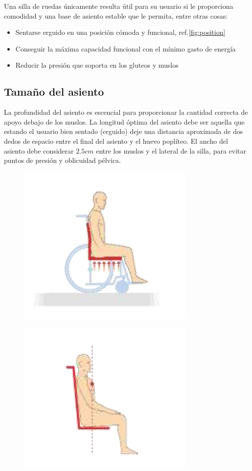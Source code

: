 Una silla de ruedas \'unicamente resulta \'util para su usuario si le
proporciona comodidad y una base de asiento estable que le permita, entre otras
cosas:
\begin{itemize}
    \item Sentarse erguido en una posici\'on c\'omoda y funcional,
        ref.\ref{fig:position}
    \item Conseguir la m\'axima capacidad funcional con el m\'inimo gasto de
        energ\'ia
    \item Reducir la presi\'on que soporta en los gluteos y muslos
        \parencite{posicion}
\end{itemize}

\subsection{Tama\~no del asiento}


La profundidad del asiento es escencial para proporcionar la cantidad correcta
de apoyo debajo de los muslos. La longitud \'optima del asiento debe ser aquella
que estando el usuario bien sentado (erguido) deje una distancia aproximada de
dos dedos de espacio entre el final del asiento y el huevo popl\'iteo. El ancho
del asiento debe considerar $2.5cm$ entre los muslos y el lateral de la silla,
para evitar puntos de presi\'on y oblicuidad p\'elvica. \\

\begin{figure}[th]
\centering
\begin{minipage}{.5\textwidth}
  \centering
  \includegraphics[width=.5\linewidth]{Figures/asiento.png}
\end{minipage}%
\begin{minipage}{.5\textwidth}
  \centering
  \includegraphics[width=.5\linewidth]{Figures/asiento1.png}
  \label{fig:asiento}
\end{minipage}
\end{figure}

